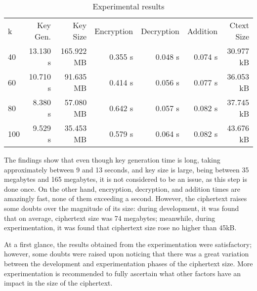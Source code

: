\documentclass{article}
\begin{document}
\begin{table}[h]
  \caption{Experimental results}
  \label{tbl:results}
\begin{tabular}{lrrrrrr}
k   & Key Gen. & Key Size  & Encryption & Decryption & Addition & Ctext Size \\
40  & 13.130 s & 165.922 MB & 0.355 s    & 0.048 s    & 0.074 s  & 30.977 kB        \\
60  & 10.710 s & 91.635 MB  & 0.414 s    & 0.056 s    & 0.077 s  & 36.053 kB        \\
80  & 8.380 s  & 57.080 MB  & 0.642 s    & 0.057 s    & 0.082 s  & 37.745 kB        \\
100 & 9.529 s  & 35.453 MB  & 0.579 s    & 0.064 s    & 0.082 s  & 43.676 kB
\end{tabular}
\end{table}

The findings show that even though key generation time is long, taking approximately between 9 and 13 seconds, and key size is large, being between 35 megabytes and 165 megabytes, it is not considered to be an issue, as this step is done once. On the other hand, encryption, decryption, and addition times are amazingly fast, none of them exceeding a second. However, the ciphertext raises some doubts over the magnitude of its size: during development, it was found that on average, ciphertext size was 74 megabytes; meanwhile, during experimentation, it was found that ciphertext size rose no higher than 45kB.

At a first glance, the results obtained from the experimentation were satisfactory; however, some doubts were raised upon noticing that there was a great variation between the development and experimentation phases of the ciphertext size. More experimentation is recommended to fully ascertain what other factors have an impact in the size of the ciphertext.
\end{document}
